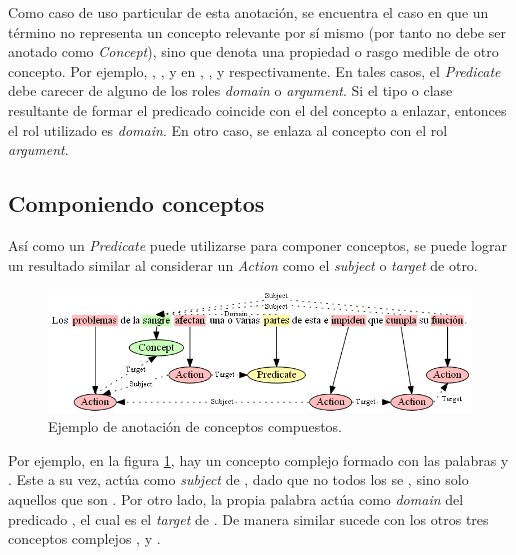 Como caso de uso particular de esta anotación, se encuentra el caso en que un término no representa un concepto relevante por sí mismo (por tanto no debe ser anotado como \textit{Concept}), sino que denota una propiedad o rasgo medible de otro concepto. Por ejemplo, , ,  y  en , ,  y  respectivamente.
En tales casos, el \textit{Predicate} debe carecer de alguno de los roles \textit{domain} o \textit{argument}. Si el tipo o clase resultante de formar el predicado coincide con el del concepto a enlazar, entonces el rol utilizado es \textit{domain}. En otro caso, se enlaza al concepto con el rol \textit{argument}.

\subsection{Componiendo conceptos}
\label{section:composing_concepts}
Así como un \textit{Predicate} puede utilizarse para componer conceptos, se puede lograr un resultado similar al considerar un \textit{Action} como el \textit{subject} o \textit{target} de otro.

\begin{figure}[H]
	\begin{center}
		\includegraphics[width=\textwidth]{graphics/annotation_example_composing_concepts.png}
		\caption[Anotación de conceptos compuestos]{Ejemplo de anotación de conceptos compuestos.}
		\label{fig:annotation_example_composing_concepts}
	\end{center}
\end{figure}

Por ejemplo, en la figura \ref{fig:annotation_example_composing_concepts}, hay un concepto complejo formado con las palabras  y . Este a su vez, actúa como \textit{subject} de , dado que no todos los  se , sino solo aquellos que son . Por otro lado, la propia palabra  actúa como \textit{domain} del predicado , el cual es el \textit{target} de . De manera similar sucede con los otros tres conceptos complejos ,  y .

